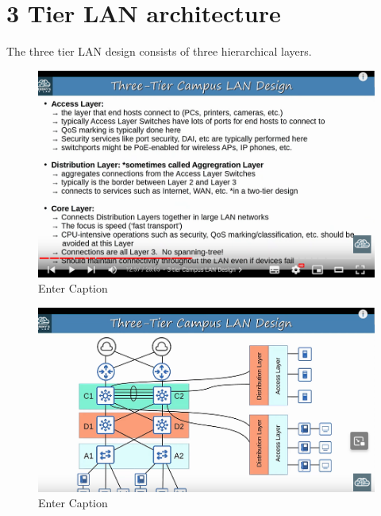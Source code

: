 \documentclass{report}
\begin{document}
	\section{3 Tier LAN architecture}
	The three tier LAN design consists of three hierarchical layers.
	\begin{figure}
		\centering
		\includegraphics[width=0.5\linewidth]{3tierlan.png}
		\caption{Enter Caption}
		\label{fig:enter-label}
	\end{figure}
	\begin{figure}
		\centering
		\includegraphics[width=0.5\linewidth]{3tierlan1.png}
		\caption{Enter Caption}
		\label{fig:enter-label}
	\end{figure}
\end{document}
